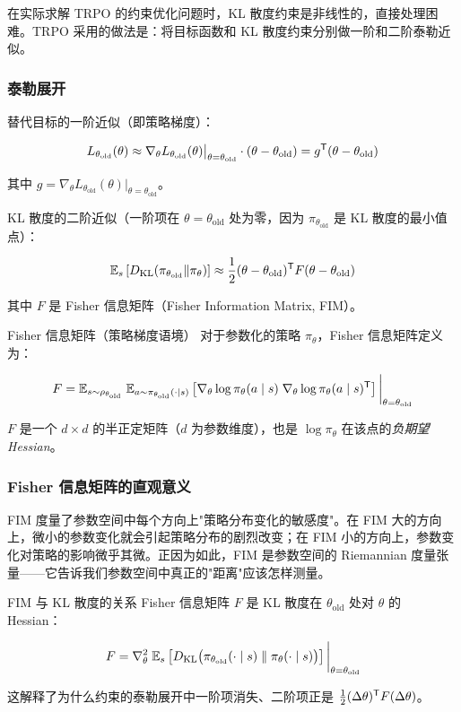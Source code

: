 在实际求解 TRPO 的约束优化问题时，KL 散度约束是非线性的，直接处理困难。TRPO 采用的做法是：将目标函数和 KL 散度约束分别做一阶和二阶泰勒近似。

\subsubsection{泰勒展开}

替代目标的一阶近似（即策略梯度）：

\[
L_{\theta_{\text{old}}}(\theta) \approx \nabla_\theta L_{\theta_{\text{old}}}(\theta)\big|_{\theta=\theta_{\text{old}}} \cdot (\theta - \theta_{\text{old}}) = g^{\mathsf{T}} (\theta - \theta_{\text{old}})
\]

其中 $g = \nabla_\theta L_{\theta_{\text{old}}}(\theta)|_{\theta=\theta_{\text{old}}}$。

KL 散度的二阶近似（一阶项在 $\theta = \theta_{\text{old}}$ 处为零，因为 $\pi_{\theta_{\text{old}}}$ 是 KL 散度的最小值点）：

\[
\mathbb{E}_s\left[ D_{\text{KL}}(\pi_{\theta_{\text{old}}} \| \pi_\theta) \right]
\approx \frac{1}{2} (\theta - \theta_{\text{old}})^{\mathsf{T}} F (\theta - \theta_{\text{old}})
\]

其中 $F$ 是 Fisher 信息矩阵（Fisher Information Matrix, FIM）。

\begin{mydefinition}{Fisher 信息矩阵（策略梯度语境）}
对于参数化的策略 $\pi_\theta$，Fisher 信息矩阵定义为：

\[
F = \mathbb{E}_{s \sim \rho_{\theta_{\text{old}}}} \;
\mathbb{E}_{a \sim \pi_{\theta_{\text{old}}}(\cdot \mid s)}
\left[ \nabla_\theta \log \pi_\theta(a \mid s) \;
\nabla_\theta \log \pi_\theta(a \mid s)^{\mathsf{T}} \right]
\bigg|_{\theta = \theta_{\text{old}}}
\]

$F$ 是一个 $d \times d$ 的半正定矩阵（$d$ 为参数维度），也是 $\log \pi_\theta$ 在该点的\emph{负期望 Hessian}。
\end{mydefinition}

\subsubsection{Fisher 信息矩阵的直观意义}

FIM 度量了参数空间中每个方向上"策略分布变化的敏感度"。在 FIM 大的方向上，微小的参数变化就会引起策略分布的剧烈改变；在 FIM 小的方向上，参数变化对策略的影响微乎其微。正因为如此，FIM 是参数空间的 Riemannian 度量张量——它告诉我们参数空间中真正的"距离"应该怎样测量。

\begin{myTheorem}{FIM 与 KL 散度的关系}
Fisher 信息矩阵 $F$ 是 KL 散度在 $\theta_{\text{old}}$ 处对 $\theta$ 的 Hessian：

\[
F = \nabla^2_{\theta} \;
\mathbb{E}_s\left[ D_{\text{KL}}\big( \pi_{\theta_{\text{old}}}(\cdot \mid s) \;\|\; \pi_\theta(\cdot \mid s) \big) \right]
\bigg|_{\theta = \theta_{\text{old}}}
\]

这解释了为什么约束的泰勒展开中一阶项消失、二阶项正是 $\frac{1}{2}(\Delta\theta)^{\mathsf{T}} F (\Delta\theta)$。
\end{myTheorem}

